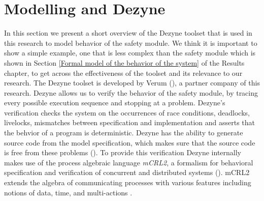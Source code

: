 \documentclass[12pt]{scrreprt}
\begin{document}
\section{Modelling and Dezyne}
\label{Modelling and Dezyne}
In this section we present a short overview of the Dezyne toolset that is used in this research to model behavior of the safety module. We think it is important to show a simple example, one that is less complex than the safety module which is shown in Section \ref{Formal model of the behavior of the system} of the Results chapter, to get across the effectiveness of the toolset and its relevance to our research. The Dezyne toolset is developed by Verum (\cite{verum}), a partner company of this research. Dezyne allows us to verify the behavior of the safety module, by tracing every possible execution sequence and stopping at a problem. Dezyne's verification checks the system on the occurrences of race conditions, deadlocks, livelocks, mismatches between specification and implementation and asserts that the behvior of a program is deterministic. Dezyne has the ability to generate source code from the model specification, which makes sure that the source code is free from these problems (\cite{dzntut}).
To provide this verification Dezyne internally makes use of the process algebraic language \textit{mCRL2}, a formalism for behavioral specification and verification of concurrent and distributed systems (\cite{mcrl2}). mCRL2 extends the algebra of communicating processes with various features including notions of data, time, and multi-actions .
\end{document}
